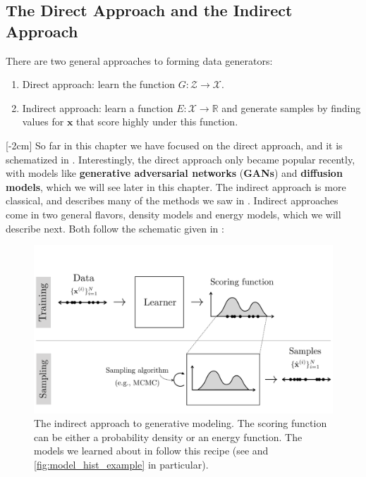 \subsection{The Direct Approach and the Indirect Approach}
There are two general approaches to forming data generators:
\begin{enumerate}
    \item Direct approach: learn the function $G: \mathcal{Z} \rightarrow \mathcal{X}$.
    \item Indirect approach: learn a function $E: \mathcal{X} \rightarrow \mathbb{R}$ and generate samples by finding values for $\mathbf{x}$ that score highly under this function.
\end{enumerate}
[-2cm]
So far in this chapter we have focused on the direct approach, and it is schematized in \fig{\ref{fig:generative_models:gen_model_training_vs_sampling}}. Interestingly, the direct approach only became popular recently, with models like \textbf{generative adversarial networks} (\textbf{GANs}) and \textbf{diffusion models}, which we will see later in this chapter. The indirect approach is more classical, and describes many of the methods we saw in \chap{\ref{chapter:stat_image_models}}. Indirect approaches come in two general flavors, density models and energy models, which we will describe next. Both follow the schematic given in \fig{\ref{fig:generative_models:gen_model_training_vs_sampling_indirect}}:
\begin{figure}[h]
    \centerline{
    \includegraphics[width=1.0\linewidth]{./figures/generative_models/gen_model_training_vs_sampling_indirect.pdf}
    }
    \caption{The indirect approach to generative modeling. The scoring function can be either a probability density or an energy function. The models we learned about in \chap{\ref{chapter:stat_image_models}} follow this recipe (see \figs{\ref{fig:model_training_vs_sampling}} and \ref{fig:model_hist_example} in particular).}
    \label{fig:generative_models:gen_model_training_vs_sampling_indirect}
\end{figure}

